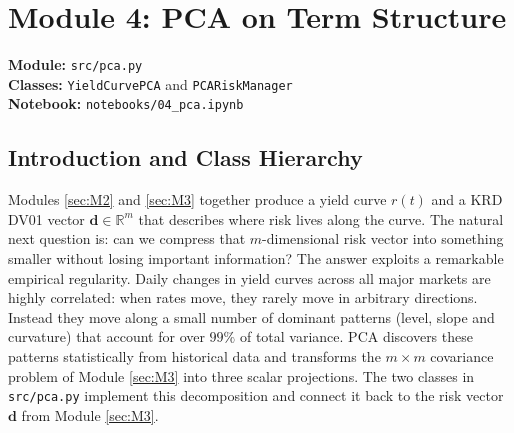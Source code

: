 \documentclass{article}
\theoremstyle{definition}  %
\theoremstyle{plain}  %
\numberwithin{definition}{section}
\numberwithin{proposition}{section}
\numberwithin{theorem}{section}
\numberwithin{equation}{section}
\begin{document}
\newpage

\section{Module 4: PCA on Term Structure}
\label{sec:M4}

\begin{tcolorbox}[title = Python Implementation, colback = pythonyellow!70!white, colframe = pythonblue]
    \textbf{Module:} \color{magenta} \texttt{src/pca.py} \color{black} \\
    \textbf{Classes:} \color{codegreen} \texttt{YieldCurvePCA} \color{black} and \color{codegreen} \texttt{PCARiskManager} \color{black} \\
    \textbf{Notebook:} \texttt{notebooks/04\_pca.ipynb}
\end{tcolorbox}

\subsection{Introduction and Class Hierarchy}

Modules \ref{sec:M2} and \ref{sec:M3} together produce 
a yield curve $r(t)$ and a KRD DV01 vector 
$\mathbf{d} \in \mathbb{R}^{m}$ that describes where 
risk lives along the curve. The natural next question 
is: can we compress that $m$-dimensional risk vector 
into something smaller without losing important 
information? The answer exploits a remarkable empirical regularity. Daily changes in yield curves across all major markets are highly correlated: when rates move, they rarely 
move in arbitrary directions. Instead they move along a small number of dominant patterns (level, slope and curvature) that account for over $99\%$ of total variance. PCA discovers these patterns statistically from historical data and transforms the $m \times m$ covariance problem of Module \ref{sec:M3} into three scalar projections. The two classes in \color{magenta} \texttt{src/pca.py} \color{black} implement this decomposition and connect it back to the risk vector 
$\mathbf{d}$ from Module \ref{sec:M3}.
\end{document}
